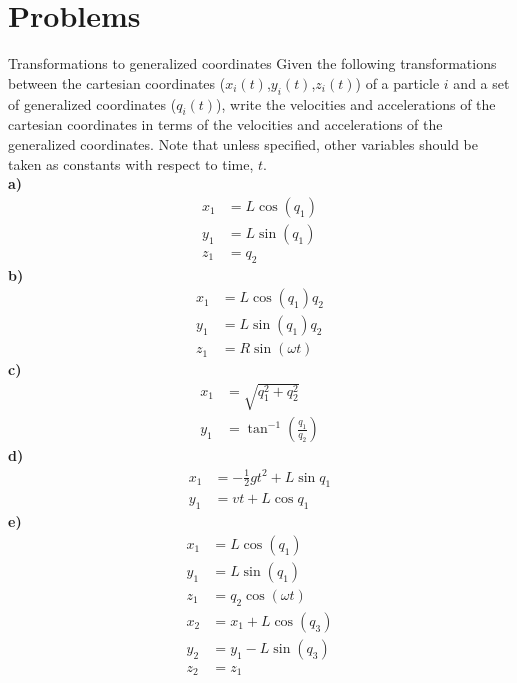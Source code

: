 \section{Problems}
\begin{problem}{Transformations to generalized coordinates}
\label{prob_Intro_1}
Given the following transformations between the cartesian coordinates ($x_i(t)$,$y_i(t)$,$z_i(t)$) of a particle $i$ and a set of generalized coordinates ($q_i(t)$), write the velocities and accelerations of the cartesian coordinates in terms of the velocities and accelerations of the generalized coordinates. Note that unless specified, other variables should be taken as constants with respect to time, $t$.\\
\textbf{a)}
 \begin{align*}
x_1&=L\cos(q_1)\\
y_1&=L\sin(q_1)\\
z_1&=q_2
\end{align*}
\textbf{b)}
\begin{align*}
x_1&=L\cos(q_1)q_2\\
y_1&=L\sin(q_1)q_2\\
z_1&=R\sin(\omega t)
\end{align*}
\textbf{c)}
\begin{align*}
x_1&=\sqrt{q_1^2+q_2^2}\\
y_1&=\tan^{-1}\left(\frac{q_1}{q_2}\right)
\end{align*}
\textbf{d)}
\begin{align*}
x_1&=-\frac{1}{2}gt^2+L\sin{q_1}\\
y_1&=vt+L\cos{q_1}
\end{align*}
\textbf{e)}
\begin{align*}
x_1&=L\cos(q_1)\\
y_1&=L\sin(q_1)\\
z_1&=q_2 \cos(\omega t)\\
x_2&=x_1+L\cos(q_3)\\
y_2&=y_1-L\sin(q_3)\\
z_2&=z_1
\end{align*}
\end{problem}
%
